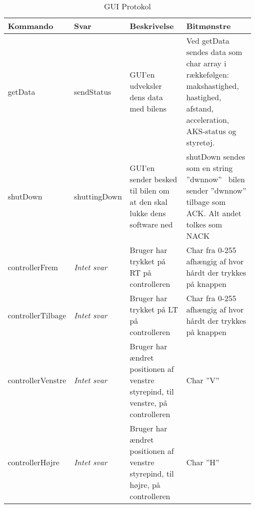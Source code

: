 \begin{table}[h]
\begin{tabularx}{\textwidth}{| Z | Z | Z | Z |} \hline

\textbf{Kommando} 						&
\textbf{Svar}							&
\textbf{Beskrivelse}					&
\textbf{Bitmønstre}						\\ \hline

getData &

sendStatus &

GUI'en udveksler dens data med bilens &

Ved getData sendes data som char array i rækkefølgen: makshastighed, hastighed, afstand, acceleration, AKS-status og styretøj. \\ \hline



shutDown &

shuttingDown &

GUI'en sender besked til bilen om at den skal lukke dens software ned &

shutDown sendes som en string ''dwnnow'' \
bilen sender ''dwnnow'' tilbage som ACK. Alt andet tolkes som NACK \\ \hline



controllerFrem &

\textit{Intet svar} &

Bruger har trykket på RT på controlleren &

Char fra 0-255 afhængig af hvor hårdt der trykkes på knappen \\ \hline



controllerTilbage &

\textit{Intet svar} &

Bruger har trykket på LT på controlleren &

Char fra 0-255 afhængig af hvor hårdt der trykkes på knappen \\ \hline



controllerVenstre &

\textit{Intet svar} &

Bruger har ændret positionen af venstre styrepind, til venstre, på controlleren &

Char ''V'' \\ \hline



controllerHøjre &

\textit{Intet svar} &

Bruger har ændret positionen af venstre styrepind, til højre, på controlleren &

Char ''H'' \\ \hline

\end{tabularx}
\caption{GUI Protokol}
\label{tbl:prt_gui}
\end{table}